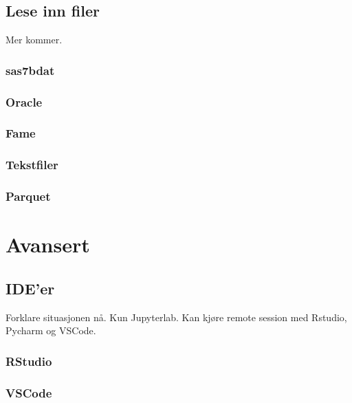 \documentclass[
  letterpaper,
  DIV=11,
  numbers=noendperiod]{scrreprt}
\begin{document}
\hypertarget{lese-inn-filer}{%
\chapter{Lese inn filer}\label{lese-inn-filer}}

Mer kommer.

\hypertarget{sas7bdat}{%
\section{sas7bdat}\label{sas7bdat}}

\hypertarget{oracle}{%
\section{Oracle}\label{oracle}}

\hypertarget{fame}{%
\section{Fame}\label{fame}}

\hypertarget{tekstfiler}{%
\section{Tekstfiler}\label{tekstfiler}}

\hypertarget{parquet}{%
\section{Parquet}\label{parquet}}

\part{Avansert}

\hypertarget{ideer}{%
\chapter{IDE'er}\label{ideer}}

Forklare situasjonen nå. Kun Jupyterlab. Kan kjøre remote session med
Rstudio, Pycharm og VSCode.

\hypertarget{rstudio}{%
\section{RStudio}\label{rstudio}}

\hypertarget{vscode}{%
\section{VSCode}\label{vscode}}
\end{document}
